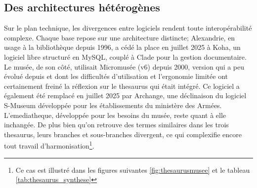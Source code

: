\subsection{Des architectures hétérogènes}

Sur le plan technique, les divergences entre logiciels rendent toute interopérabilité complexe. Chaque base repose sur une architecture distincte; Alexandrie, en usage à la bibliothèque depuis 1996, a cédé la place en juillet 2025 à Koha, un logiciel libre structuré en MySQL, couplé à Clade pour la gestion documentaire. Le musée, de son côté, utilisait Micromusée (v6) depuis 2000, version qui a peu évolué depuis et dont les difficultés d'utilisation et l'ergonomie limitée ont certainement freiné la réflexion sur le \gls{thesaurus} qui était intégré. Ce logiciel a également été remplacé en juillet 2025 par Archange, une déclinaison du logiciel S-Museum développée pour les établissements du ministère des Armées. L'\gls{emediatheque}, développée pour les besoins du musée, reste quant à elle inchangée. De plus bien qu'on retrouve des termes similaires dans les trois \gls{thesaurus}, leurs branches et sous-branches divergent, ce qui complexifie encore tout travail d'harmonisation\footnote{Ce cas est illustré dans les figures suivantes \ref{fig:thesaurusmusee} et le tableau \ref{tab:thesaurus_synthese}}.

